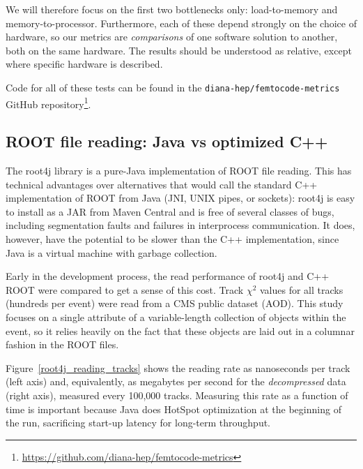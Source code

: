 \documentclass[12pt]{article}
\begin{document}
We will therefore focus on the first two bottlenecks only: load-to-memory and memory-to-processor. Furthermore, each of these depend strongly on the choice of hardware, so our metrics are {\it comparisons} of one software solution to another, both on the same hardware. The results should be understood as relative, except where specific hardware is described.

Code for all of these tests can be found in the {\tt diana-hep/femtocode-metrics} GitHub repository\footnote{\url{https://github.com/diana-hep/femtocode-metrics}}.

\subsection*{ROOT file reading: Java vs optimized C++}

The root4j library is a pure-Java implementation of ROOT file reading. This has technical advantages over alternatives that would call the standard C++ implementation of ROOT from Java (JNI, UNIX pipes, or sockets): root4j is easy to install as a JAR from Maven Central and is free of several classes of bugs, including segmentation faults and failures in interprocess communication. It does, however, have the potential to be slower than the C++ implementation, since Java is a virtual machine with garbage collection.

Early in the development process, the read performance of root4j and C++ ROOT were compared to get a sense of this cost. Track $\chi^2$ values for all tracks (hundreds per event) were read from a CMS public dataset (AOD). This study focuses on a single attribute of a variable-length collection of objects within the event, so it relies heavily on the fact that these objects are laid out in a columnar fashion in the ROOT files.

Figure~\ref{root4j_reading_tracks} shows the reading rate as nanoseconds per track (left axis) and, equivalently, as megabytes per second for the {\it decompressed} data (right axis), measured every 100,000 tracks. Measuring this rate as a function of time is important because Java does HotSpot optimization at the beginning of the run, sacrificing start-up latency for long-term throughput.
\end{document}
